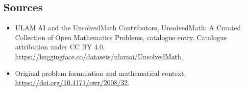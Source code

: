 \documentclass[11pt]{article}
\begin{document}
\subsection{Sources}
\begin{itemize}
\item[\hypertarget{source:statement:1}{S1}] ULAM.AI and the UnsolvedMath Contributors, UnsolvedMath: A Curated Collection of Open Mathematics Problems, catalogue entry. Catalogue attribution under CC BY 4.0.
\url{https://huggingface.co/datasets/ulamai/UnsolvedMath}.
\item[\hypertarget{source:statement:2}{S2}] Original problem formulation and mathematical context.
\url{https://doi.org/10.4171/owr/2008/32}.
\end{itemize}
\label{end:statement}
\end{document}
